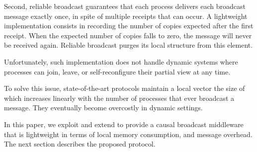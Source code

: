 Second, reliable broadcast guarantees that each process delivers each broadcast
message exactly once, in spite of multiple receipts that can occur. A
lightweight implementation consists in recording the number of copies expected
after the first receipt. When the expected number of copies falls to zero, the
message will never be received again. Reliable broadcast purges its local
structure from this element. 

Unfortunately, such implementation does not handle dynamic systems where
processes can join, leave, or self-reconfigure their partial view at any
time.  

To solve this issue, state-of-the-art protocols maintain a local vector the size
of which increases linearly with the number of processes that ever broadcast a
message. They eventually become overcostly in dynamic settings.

In this paper, we exploit and extend \PCBROADCAST to provide a causal broadcast
middleware that is lightweight in terms of local memory consumption, and message
overhead. The next section describes the proposed protocol.

